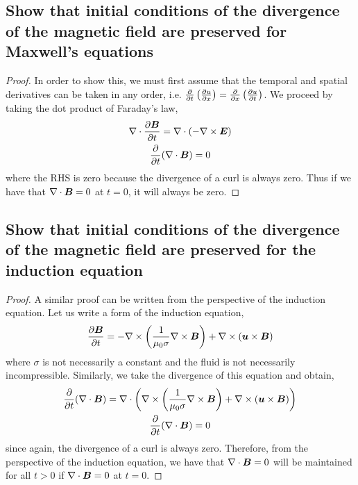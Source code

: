 \documentclass{article}
\begin{document}
\subsection{Show that initial conditions of the divergence of the magnetic field are preserved for Maxwell's equations}
\begin{proof}
    In order to show this, we must first assume that the temporal and spatial
    derivatives can be taken in any order, i.e. $\frac{\partial }{\partial t}\left(\frac{\partial u}{\partial x}\right) =
    \frac{\partial }{\partial x}\left(\frac{\partial u}{\partial t}\right)$. 
    We proceed by taking the dot product of Faraday's law, 
    \begin{gather*}
        \nabla\cdot\frac{\partial \boldsymbol{B}}{\partial t} = \nabla\cdot(-\nabla\times\boldsymbol{E})\\
        \frac{\partial }{\partial t}(\nabla\cdot\boldsymbol{B}) = 0
    \end{gather*}
    where the RHS is zero because the divergence of a curl is always zero. Thus
    if we have that $\nabla \cdot{\boldsymbol{B}} = 0$ at $t = 0$, it will always be zero. 
\end{proof}

\subsection{Show that initial conditions of the divergence of the magnetic field are preserved for the induction equation}

\begin{proof}
    A similar proof can be written from the perspective of the induction
    equation. Let us write a form of the induction equation, 
    \begin{gather*}
        \frac{\partial \boldsymbol{B}}{\partial t} = - \nabla\times\left(\frac{1}{\mu_0\sigma}\nabla\times\boldsymbol{B}\right) + \nabla\times(\boldsymbol{u}\times\boldsymbol{B})
    \end{gather*}
    where $\sigma$ is not necessarily a constant and the fluid is not
    necessarily incompressible. Similarly, we take the divergence of this
    equation and obtain,
    \begin{gather*}
        \frac{\partial }{\partial t}(\nabla \cdot{\boldsymbol{B}})  = \nabla\cdot\left(
        \nabla\times\left(\frac{1}{\mu_0\sigma}\nabla\times\boldsymbol{B}\right) +
        \nabla\times(\boldsymbol{u}\times\boldsymbol{B})\right)\\
        \frac{\partial }{\partial t}(\nabla \cdot{\boldsymbol{B}})  = 0
    \end{gather*}
    since again, the divergence of a curl is always zero. Therefore, from the
    perspective of the induction equation, we have that $\nabla \cdot{\boldsymbol{B}} = 0$ will be
    maintained for all $t>0$ if $\nabla \cdot{\boldsymbol{B}} = 0$ at $t=0$. 
\end{proof}
\end{document}
